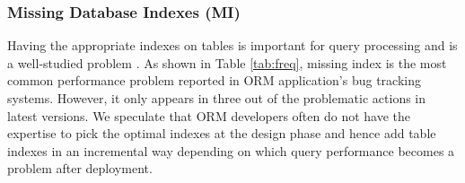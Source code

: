 \vspace{-0.10in}
\subsubsection{Missing Database Indexes (MI)}

Having the appropriate indexes on tables is important for query processing and is a 
well-studied problem \cite{Ullman:1997}. 
As shown in Table \ref{tab:freq}, missing index is the most common performance problem reported in ORM application's bug tracking systems. However, it only appears in three out of the \numpactions problematic actions in latest versions.
We speculate that ORM developers
often do not have the expertise to pick the optimal indexes at the design
phase and hence add table indexes in an incremental way depending on
which query performance becomes a problem after deployment.




